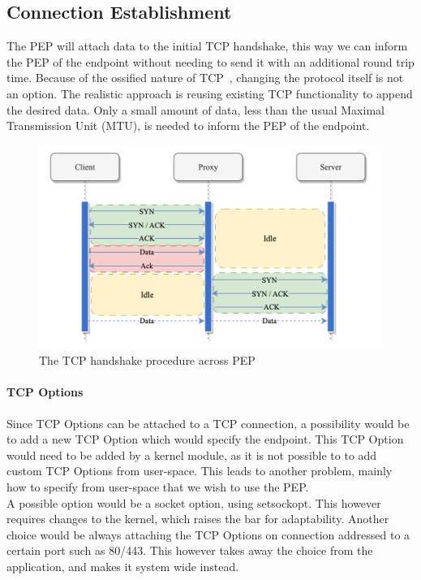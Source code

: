 \documentclass[a4paper,english, 11pt]{report}
\begin{document}
\subsection{Connection Establishment}  
The PEP will attach data to the initial TCP handshake, this way we can inform the PEP of the endpoint without needing to send it with an additional round trip time. Because of the ossified nature of TCP~\cite{tcp_extendable}, changing the protocol itself is not an option. The realistic approach is reusing existing TCP functionality to append the desired data. Only a small amount of data, less than the usual Maximal Transmission Unit (MTU), is needed to inform the PEP of the endpoint. \\

\begin{figure} %
	\centering
	\includegraphics[scale=0.75]{../diagrams/drawio/tcphandshake_primitiv.png}
  	\caption{The TCP handshake procedure across PEP}
  	\label{fig:tcphandshake_primitiv}
\end{figure}

\paragraph{TCP Options}
Since TCP Options can be attached to a TCP connection, a possibility would be to add a new TCP Option which would specify the endpoint. This TCP Option would need to be added by a kernel module, as it is not possible to to add custom TCP Options from user-space. This leads to another problem, mainly how to specify from user-space that we wish to use the PEP.\\

A possible option would be a socket option, using setsockopt. This however requires changes to the kernel, which raises the bar for adaptability. Another choice would be always attaching the TCP Options on connection addressed to a certain port such as 80/443. This however takes away the choice from the application, and makes it system wide instead.\\
\end{document}
